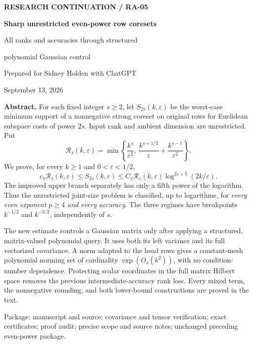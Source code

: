 \documentclass[11pt]{article}
\theoremstyle{remark}\newtheorem{remark}[theorem]{Remark}
\newcommand{\eps}{\varepsilon}\newcommand{\Sym}{\operatorname{Sym}}
\begin{document}
\begin{titlepage}
{\small\bfseries RESEARCH CONTINUATION / RA-05}\par\vspace{1.05cm}
{\huge\bfseries Sharp unrestricted even-power row coresets}\par\vspace{.45cm}
{\Large All ranks and accuracies through structured\par polynomial Gaussian control}\par\vspace{.7cm}
Prepared for Sidney Holden with ChatGPT\par
September 13, 2026\par\vspace{.65cm}
\textbf{Abstract.} For each fixed integer $s\ge2$, let $S_{2s}(k,\eps)$ be the worst-case minimum support of a nonnegative strong coreset on original rows for Euclidean subspace costs of power $2s$. Input rank and ambient dimension are unrestricted. Put
\[
 \mathcal R_s(k,\eps)=\min\left\{\frac{k^s}{\eps^2},\ \frac{k^{s+1/2}}{\eps}+\frac{k^{s-1}}{\eps^2}\right\}.
\]
We prove, for every $k\ge1$ and $0<\eps<1/2$,
\[
 c_s\mathcal R_s(k,\eps)\le S_{2s}(k,\eps)
 \le C_s\mathcal R_s(k,\eps)\log^{2s+5}(2k/\eps).
\]
The improved upper branch separately has only a fifth power of the logarithm. Thus the unrestricted joint-size problem is classified, up to logarithms, for \emph{every even exponent $p\ge4$ and every accuracy}. The three regimes have breakpoints $k^{-1/2}$ and $k^{-3/2}$, independently of $s$.

The new estimate controls a Gaussian matrix only after applying a structured, matrix-valued polynomial query. It uses both its left variance and its full vectorized covariance. A norm adapted to the head rows gives a constant-mesh polynomial norming set of cardinality $\exp(O_s(k^2))$, with no condition-number dependence. Protecting scalar coordinates in the full matrix Hilbert space removes the previous intermediate-accuracy rank loss. Every mixed term, the nonnegative rounding, and both lower-bound constructions are proved in the text.

\vspace{.2cm}
\vfill
{\small Package: manuscript and source; covariance and tensor verification; exact certificates; proof audit; precise scope and source notes; unchanged preceding even-power package.}
\end{titlepage}
{\small\setlength{\parskip}{0pt}\tableofcontents}\newpage
\end{document}
